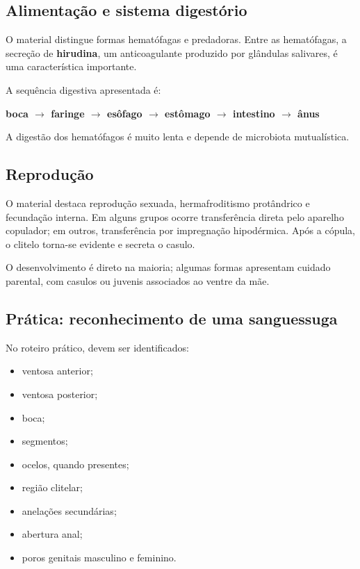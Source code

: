 \documentclass[a4paper,12pt]{article}
\newcommand{\termo}[1]{\textbf{#1}}
\begin{document}
\subsection{Alimentação e sistema digestório}

O material distingue formas hematófagas e predadoras. Entre as hematófagas, a secreção de \termo{hirudina}, um anticoagulante produzido por glândulas salivares, é uma característica importante.

A sequência digestiva apresentada é:

\begin{center}
\textbf{boca $\rightarrow$ faringe $\rightarrow$ esôfago $\rightarrow$ estômago $\rightarrow$ intestino $\rightarrow$ ânus}
\end{center}

A digestão dos hematófagos é muito lenta e depende de microbiota mutualística.

\subsection{Reprodução}

O material destaca reprodução sexuada, hermafroditismo protândrico e fecundação interna. Em alguns grupos ocorre transferência direta pelo aparelho copulador; em outros, transferência por impregnação hipodérmica. Após a cópula, o clitelo torna-se evidente e secreta o casulo.

O desenvolvimento é direto na maioria; algumas formas apresentam cuidado parental, com casulos ou juvenis associados ao ventre da mãe.

\subsection{Prática: reconhecimento de uma sanguessuga}

No roteiro prático, devem ser identificados:

\begin{itemize}
  \item ventosa anterior;
  \item ventosa posterior;
  \item boca;
  \item segmentos;
  \item ocelos, quando presentes;
  \item região clitelar;
  \item anelações secundárias;
  \item abertura anal;
  \item poros genitais masculino e feminino.
\end{itemize}
\end{document}

